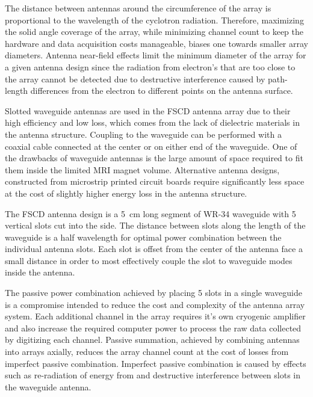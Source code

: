 The distance between antennas around the circumference of the array is proportional to the wavelength of the cyclotron radiation. Therefore, maximizing the solid angle coverage of the array, while minimizing channel count to keep the hardware and data acquisition costs manageable, biases one towards smaller array diameters. Antenna near-field effects limit the minimum diameter of the array for a given antenna design since the radiation from electron's that are too close to the array cannot be detected due to destructive interference caused by path-length differences from the electron to different points on the antenna surface. 

Slotted waveguide antennas are used in the FSCD antenna array due to their high efficiency and low loss, which comes from the lack of dielectric materials in the antenna structure. Coupling to the waveguide can be performed with a coaxial cable connected at the center or on either end of the waveguide. One of the drawbacks of waveguide antennas is the large amount of space required to fit them inside the limited MRI magnet volume. Alternative antenna designs, constructed from microstrip printed circuit boards require significantly less space at the cost of slightly higher energy loss in the antenna structure. 

The FSCD antenna design is a 5~cm long segment of WR-34 waveguide with 5 vertical slots cut into the side. The distance between slots along the length of the waveguide is a half wavelength for optimal power combination between the individual antenna slots. Each slot is offset from the center of the antenna face a small distance in order to most effectively couple the slot to waveguide modes inside the antenna.

The passive power combination achieved by placing 5 slots in a single waveguide is a compromise intended to reduce the cost and complexity of the antenna array system. Each additional channel in the array requires it's own cryogenic amplifier and also increase the required computer power to process the raw data collected by digitizing each channel. Passive summation, achieved by combining antennas into arrays axially, reduces the array channel count at the cost of losses from imperfect passive combination. Imperfect passive combination is caused by effects such as re-radiation of energy from and destructive interference between slots in the waveguide antenna. 

